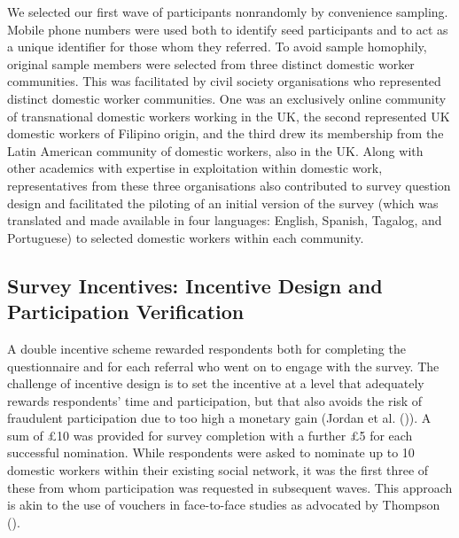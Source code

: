\documentclass[
  12pt,
]{article}
\theoremstyle{plain}
\theoremstyle{definition}
\begin{document}
We selected our first wave of participants nonrandomly by convenience
sampling. Mobile phone numbers were used both to identify seed
participants and to act as a unique identifier for those whom they
referred. To avoid sample homophily, original sample members were
selected from three distinct domestic worker communities. This was
facilitated by civil society organisations who represented distinct
domestic worker communities. One was an exclusively online community of
transnational domestic workers working in the UK, the second represented
UK domestic workers of Filipino origin, and the third drew its
membership from the Latin American community of domestic workers, also
in the UK. Along with other academics with expertise in exploitation
within domestic work, representatives from these three organisations
also contributed to survey question design and facilitated the piloting
of an initial version of the survey (which was translated and made
available in four languages: English, Spanish, Tagalog, and Portuguese)
to selected domestic workers within each community.

\subsection{Survey Incentives: Incentive Design and Participation
Verification}\label{survey-incentives-incentive-design-and-participation-verification}

A double incentive scheme rewarded respondents both for completing the
questionnaire and for each referral who went on to engage with the
survey. The challenge of incentive design is to set the incentive at a
level that adequately rewards respondents' time and participation, but
that also avoids the risk of fraudulent participation due to too high a
monetary gain (Jordan et al.
()). A sum of £10 was
provided for survey completion with a further £5 for each successful
nomination. While respondents were asked to nominate up to 10 domestic
workers within their existing social network, it was the first three of
these from whom participation was requested in subsequent waves. This
approach is akin to the use of vouchers in face-to-face studies as
advocated by Thompson ().
\end{document}

